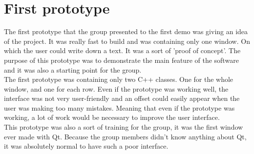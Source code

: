 \section{First prototype}
The first prototype that the group presented to the first demo was giving an idea of the project. It was really fast to build and was containing only one window. On which the user could write down a text. It was a sort of 'proof of concept'. The purpose of this prototype was to demonstrate the main feature of the software and it was also a starting point for the group.\\
The first prototype was containing only two C++ classes. One for the whole window, and one for each row. Even if the prototype was working well, the interface was not very user-friendly and an offset could easily appear when the user was making too many mistakes.
Meaning that even if the prototype was working, a lot of work would be necessary to improve the user interface. \\
This prototype was also a sort of training for the group, it was the first window ever made with Qt. Because the group members didn't know anything about Qt, it was absolutely normal to have such a poor interface.

